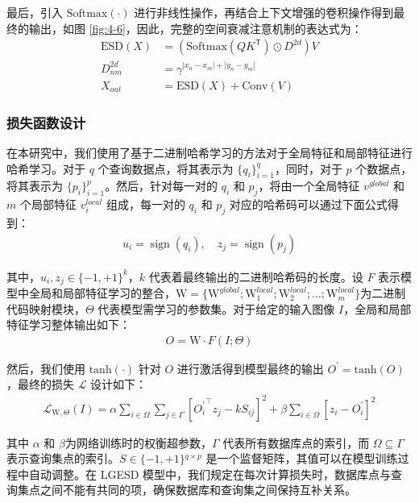 最后，引入 $\text{Softmax}(\cdot)$ 进行非线性操作，再结合上下文增强的卷积操作得到最终的输出，如图 \ref{fig:4-6}，因此，完整的空间衰减注意机制的表达式为：
\begin{align}
    \mathrm{ESD}(X)&=(\mathrm{Softmax}(QK^{\mathsf{T}})\odot D^{2d})V\\
    D_{nm}^{2d}&=\gamma^{|x_{n}-x_{m}|+|y_{n}-y_{m}|} \\
    X_{out} &= \mathrm{ESD}(X)+\mathrm{Conv}(V)
\end{align}



\subsubsection{损失函数设计}

在本研究中，我们使用了基于二进制哈希学习的方法对于全局特征和局部特征进行哈希学习。对于 $q$ 个查询数据点，将其表示为 $\{q_i\}_{i=1}^q$，同时，对于 $p$ 个数据点，将其表示为 $\{p_i\}_{i=1}^p$。然后，针对每一对的 $q_i$ 和 $p_j$，将由一个全局特征 $v^{global}$ 和 $m$ 个局部特征 $v^{local}_i$ 组成，每一对的 $q_i$ 和 $p_j$ 对应的哈希码可以通过下面公式得到：
\begin{align}
    u_i=\operatorname{sign}(q_i) ,\quad z_j=\operatorname{sign}(p_j)
\end{align}

其中，$u_i,z_j\in\{-1,+1\}^k$，$k$ 代表着最终输出的二进制哈希码的长度。设 $F$ 表示模型中全局和局部特征学习的整合，$\mathrm{W}=\{\mathrm{W}^{global};\mathrm{W}_1^{local};\mathrm{W}_2^{local};\ldots;\mathrm{W}_m^{local}\}$为二进制代码映射模块，$\Theta$ 代表模型需学习的参数集。对于给定的输入图像 $I$，全局和局部特征学习整体输出如下：
\begin{align}
    O = \mathrm{W} \cdot F(I;\Theta)
\end{align}

然后，我们使用 $\text{tanh}(\cdot)$ 针对 $O$ 进行激活得到模型最终的输出 $O^\prime = \text{tanh}(O)$，最终的损失 $\mathcal{L}$ 设计如下：
\begin{align}
    \mathcal{L}_{\mathrm{W},\Theta}(I)=
        \alpha\sum_{i\in\Omega}\sum_{j\in\Gamma}\left[{O^\prime_i}^\top z_j-kS_{ij}\right]^2+\beta\sum_{i\in\Omega}\left[z_i-{O^\prime_i}\right]^2
    \label{eq:final_eq}
\end{align}

其中 $\alpha$ 和 $\beta$为网络训练时的权衡超参数，$\Gamma$ 代表所有数据库点的索引，而 $\Omega \subseteq \Gamma$ 表示查询集点的索引。$S \in \{-1,+1\}{}^{q \times p}$ 是一个监督矩阵，其值可以在模型训练过程中自动调整。在 LGESD 模型中，我们规定在每次计算损失时，数据库点与查询集点之间不能有共同的项，确保数据库和查询集之间保持互补关系。

